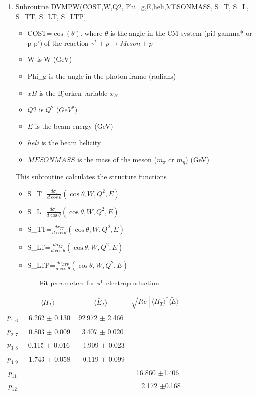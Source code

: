 \documentclass[prc,floatfix,superscriptaddress]{revtex4}
\newcommand{\GPDtE}{\langle \tilde{E} \rangle}
\newcommand{\GPDHT}{\langle H_T \rangle}
\newcommand{\ETbar}{\langle \bar{E}_T \rangle}
\begin{document}
\begin{enumerate}
 \item Subroutine DVMPW(COST,W,Q2, Phi\_g,E,heli,MESONMASS, S\_T, S\_L, S\_TT, S\_LT, S\_LTP)
        \begin {itemize}
                  \item COST=$\cos(\theta)$, where $\theta$ is the  angle in the CM system (pi0-gamma* or  p-p') of the reaction $\gamma^*+p\to Meson+p$ 
                  \item W is W (GeV)
                  \item Phi\_g is the  angle in the photon frame (radians)
                  \item $xB$ is the Bjorken variable $x_B$
                  \item $Q2$ is  $Q^2$ ($GeV^2$)
                  \item $E$  is the  beam energy (GeV)
                  \item $heli$ is the  beam helicity
                  \item $ MESONMASS$ is the mass of the meson ($m_\pi$ or $m_\eta$) (GeV)
         \end{itemize}

	This subroutine calculates the structure functions
	\begin{itemize}
		\item S\_T=$\frac{d\sigma_T}{d\cos\theta}(\cos\theta,W,Q^2,E)$
		\item S\_L=$\frac{d\sigma_L}{d\cos\theta}(\cos\theta,W,Q^2,E)$
		\item S\_TT=$\frac{d\sigma_{TT}}{d\cos\theta}(\cos\theta,W,Q^2,E)$
		\item S\_LT=$\frac{d\sigma_{LT}}{d\cos\theta}(\cos\theta,W,Q^2,E)$
		\item S\_LTP=$\frac{d\sigma_{LTP}}{d\cos\theta}(\cos\theta,W,Q^2,E)$
	\end{itemize}

\end{enumerate}





\begin{table}[h!]
\caption{Fit parameters for $\pi^0$ electroproduction}
\begin{tabular}{   | c | c | c |  c | c |}
\hline
                  &  $\GPDHT$                  & $ \ETbar$ &  $\sqrt{Re[\GPDHT^*\GPDtE]}$    \\
\hline
$p_{1,6}$  & \ 6.262 $\pm$ 0.130  & 92.972  $\pm$ 2.466 &    \\
$p_{2,7}$  &\  0.803  $\pm$ 0.009& \ 3.407  $\pm$ 0.020&    \\
$p_{3,8}$   & -0.115  $\pm$ 0.016& \  -1.909 $\pm$ 0.023&    \\
$p_{4,9}$  & \  1.743 $\pm$ 0.058 &\  -0.119  $\pm$  0.099 &  \\
\hline
$p_{11}$  &   &   &   16.860  $\pm$1.406 \\
$p_{12}$  &   &   & \ \   2.172  $\pm$0.168 \\
\hline
\end{tabular}
\label{Tab:pi0_fit_parameters}
\end{table}
\end{document}
